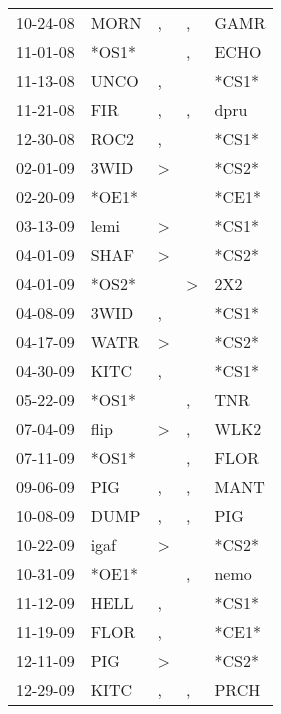 \begin{supertabular}{lllll}
 10-24-08 &   MORN &                , &                , &   GAMR \\
 11-01-08 &  *OS1* &                  &                , &   ECHO \\
 11-13-08 &   UNCO &                , &                  &  *CS1* \\
 11-21-08 &    FIR &                , &                , &   dpru \\
 12-30-08 &   ROC2 &                , &                  &  *CS1* \\
 02-01-09 &   3WID &     \textgreater &                  &  *CS2* \\
 02-20-09 &  *OE1* &                  &                  &  *CE1* \\
 03-13-09 &   lemi &     \textgreater &                  &  *CS1* \\
 04-01-09 &   SHAF &     \textgreater &                  &  *CS2* \\
 04-01-09 &  *OS2* &                  &     \textgreater &    2X2 \\
 04-08-09 &   3WID &                , &                  &  *CS1* \\
 04-17-09 &   WATR &     \textgreater &                  &  *CS2* \\
 04-30-09 &   KITC &                , &                  &  *CS1* \\
 05-22-09 &  *OS1* &                  &                , &    TNR \\
 07-04-09 &   flip &     \textgreater &                , &   WLK2 \\
 07-11-09 &  *OS1* &                  &                , &   FLOR \\
 09-06-09 &    PIG &                , &                , &   MANT \\
 10-08-09 &   DUMP &                , &                , &    PIG \\
 10-22-09 &   igaf &     \textgreater &                  &  *CS2* \\
 10-31-09 &  *OE1* &                  &                , &   nemo \\
 11-12-09 &   HELL &                , &                  &  *CS1* \\
 11-19-09 &   FLOR &                , &                  &  *CE1* \\
 12-11-09 &    PIG &     \textgreater &                  &  *CS2* \\
 12-29-09 &   KITC &                , &                , &   PRCH \\

\end{supertabular}
